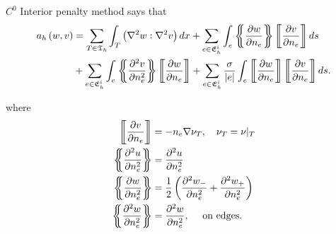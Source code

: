 $C^{0}$ Interior penalty method says that
\begin{align*}
    a_{h} \left( w,v \right) &= \sum_{T \in \mathfrak{T} _{h}}^{} \int_{T}^{} \left( \nabla ^2 w : \nabla ^2 v \right)
    dx  + \sum_{e \in \mathfrak{E} _{h}^{i}}^{} \int_{e}^{} \mean{ \frac{\partial w}{\partial n_{e}} } \jump{
    \frac{\partial v}{\partial n_{e}} } ds        \\
    & + \sum_{e \in \mathfrak{E} _{h}^{i}}^{}  \int_{e}^{}  \mean{ \frac{\partial ^2 v}{\partial n_{e}^2 } } \jump{
    \frac{\partial w}{\partial n_{e}} }     + \sum_{e \in \mathfrak{E} _{h}^{i}}^{}  \frac{\sigma }{\left\lvert e
\right\rvert } \int_{e}^{} \jump{ \frac{\partial w}{\partial n_{e}} } \jump{ \frac{\partial v}{\partial n_{e}} } ds
.\end{align*}

where
\begin{align*}
    \jump{ \frac{\partial v}{\partial n_{e}} } &= - n_{e} \nabla \nu_{T} , \quad \nu _{T} = \nu |_{T}   \\
    \mean{ \frac{\partial^2 u}{\partial n_{e}^2  } }  & = \frac{\partial ^2 u }{\partial n_{e} ^2 }  \\
    \mean{ \frac{\partial w}{\partial n^2_{e}} }  &=  \frac{1}{2} \left( \frac{\partial^2 w_{-} }{\partial n^2_{e} } +
    \frac{\partial ^2 w_{+}}{\partial n^2_{e} }   \right) \\
    \mean{ \frac{\partial ^2 w}{\partial n^2_{e} } } & = \frac{\partial ^2 w}{\partial n^2_{e}}, \quad \text{ on edges}
.\end{align*}




